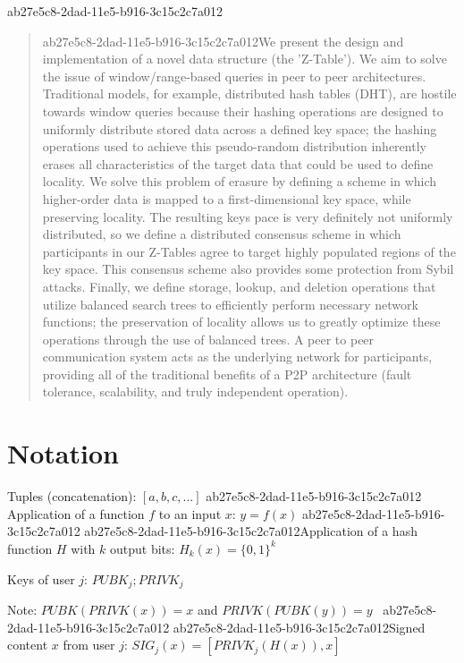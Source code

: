 \documentclass[12pt]{article}
\begin{document}
ab27e5c8-2dad-11e5-b916-3c15c2c7a012\maketitle

\begin{abstract}
ab27e5c8-2dad-11e5-b916-3c15c2c7a012We present the design and implementation of a novel data structure (the 'Z-Table'). We aim to solve the issue of window/range-based queries in peer to peer architectures. Traditional models, for example,  distributed hash tables (DHT), are hostile towards window queries because their hashing operations are designed to uniformly distribute stored data across a defined key space; the hashing operations used to achieve this pseudo-random distribution inherently erases all characteristics of the target data that could be used to define locality. We solve this problem of erasure by defining a scheme in which higher-order data is mapped to a first-dimensional key space, while preserving locality. The resulting keys pace is very definitely not uniformly distributed, so we define a distributed consensus scheme in which participants in our Z-Tables agree to target highly populated regions of the key space. This consensus scheme also provides some protection from Sybil attacks. Finally, we define storage, lookup, and deletion operations that utilize balanced search trees to efficiently perform necessary network functions; the preservation of locality allows us to greatly optimize these operations through the use of balanced trees. A peer to peer communication system acts as the underlying network for participants, providing all of the traditional benefits of a P2P architecture (fault tolerance, scalability, and truly independent operation).
\end{abstract}

\section{Notation}

Tuples (concatenation): $[a,b,c,...]$
ab27e5c8-2dad-11e5-b916-3c15c2c7a012
Application of a function $f$ to an input $x$: $y=f(x)$
ab27e5c8-2dad-11e5-b916-3c15c2c7a012
ab27e5c8-2dad-11e5-b916-3c15c2c7a012Application of a hash function $H$ with $k$ output bits: $H_{k}(x) = \{0,1\}^k$

Keys of user $j$: $ PUBK_j; PRIVK_j $

Note: $PUBK(PRIVK(x)) = x$ and $PRIVK(PUBK(y)) = y$~
ab27e5c8-2dad-11e5-b916-3c15c2c7a012
ab27e5c8-2dad-11e5-b916-3c15c2c7a012Signed content $x$ from user $j$: $SIG_j(x) = \left[ PRIVK_j( H(x) ), x \right]$
\end{document}
